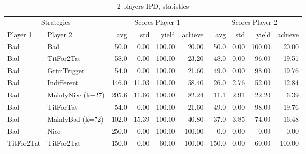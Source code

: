 \documentclass[journal,a4paper,10pt,twoside]{IEEEtran} %
\begin{document}
\balance



\onecolumn
{} \label{s:appendix}


\begin{table}[ht]
	\caption{2-players IPD, statistics}
	\label{tab:ipd2p}
	\centering
	\begin{tabular}{ll|rrrr|rrrr} \toprule
		   \multicolumn{2}{c}{Strategies}     & \multicolumn{4}{c}{Scores Player 1} & \multicolumn{4}{c}{Scores Player 2} \\
		Player 1          & Player 2          &   avg &   std &  yield &    achieve &   avg &   std &  yield &    achieve \\ \midrule
		Bad               & Bad               &  50.0 &  0.00 & 100.00 &      20.00 &  50.0 &  0.00 & 100.00 &      20.00 \\
		Bad               & TitFor2Tat        &  58.0 &  0.00 & 100.00 &      23.20 &  48.0 &  0.00 &  96.00 &      19.51 \\
		Bad               & GrimTrigger       &  54.0 &  0.00 & 100.00 &      21.60 &  49.0 &  0.00 &  98.00 &      19.76 \\
		Bad               & Indifferent       & 146.0 & 11.03 & 100.00 &      58.40 &  26.0 &  2.76 &  52.00 &      12.84 \\
		Bad               & MainlyNice (k=27) & 205.6 & 11.66 & 100.00 &      82.24 &  11.1 &  2.91 &  22.20 &       6.39 \\
		Bad               & TitForTat         &  54.0 &  0.00 & 100.00 &      21.60 &  49.0 &  0.00 &  98.00 &      19.76 \\
		Bad               & MainlyBad (k=72)  & 102.0 & 15.39 & 100.00 &      40.80 &  37.0 &  3.85 &  74.00 &      16.48 \\
		Bad               & Nice              & 250.0 &  0.00 & 100.00 &     100.00 &   0.0 &  0.00 &   0.00 &       0.00 \\
		TitFor2Tat        & TitFor2Tat        & 150.0 &  0.00 &  60.00 &     100.00 & 150.0 &  0.00 &  60.00 &     100.00 \\

\end{tabular}
\end{table}
\end{document}
